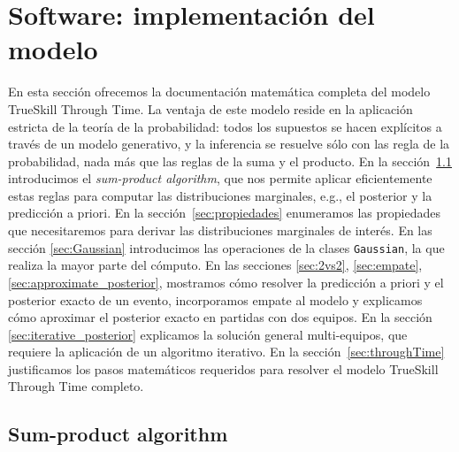 \documentclass[a4paper,11pt]{book}
\theoremstyle{definition}
\begin{document}
\section{Software: implementación del modelo}


En esta secci\'on ofrecemos la documentaci\'on matemática completa del modelo TrueSkill Through Time.
%
La ventaja de este modelo reside en la aplicaci\'on estricta de la teoría de la probabilidad: todos los supuestos se hacen expl\'icitos a trav\'es de un modelo generativo, y la inferencia se resuelve s\'olo con las regla de la probabilidad, nada más que las reglas de la suma y el producto.
%
En la secci\'on~\ref{sec:sumProductAlgorithm} introducimos el \emph{sum-product algorithm}, que nos permite aplicar eficientemente estas reglas para computar las distribuciones marginales, e.g., el posterior y la predicci\'on a priori.
%
En la secci\'on~\ref{sec:propiedades} enumeramos las propiedades que necesitaremos para derivar las distribuciones marginales de inter\'es.
%
En las secci\'on \ref{sec:Gaussian} introducimos las operaciones de la clases \texttt{Gaussian}, la que realiza la mayor parte del c\'omputo.
%
En las secciones \ref{sec:2vs2}, \ref{sec:empate}, \ref{sec:approximate_posterior}, mostramos c\'omo resolver la predicci\'on a priori y el posterior exacto de un evento, incorporamos empate al modelo y explicamos c\'omo aproximar el posterior exacto en partidas con dos equipos.
%
En la secci\'on \ref{sec:iterative_posterior} explicamos la soluci\'on general multi-equipos, que requiere la aplicaci\'on de un algoritmo iterativo.
%
En la secci\'on~\ref{sec:throughTime} justificamos los pasos matemáticos requeridos para resolver el modelo TrueSkill Through Time completo.


\subsection{Sum-product algorithm} \label{sec:sumProductAlgorithm}
\end{document}
